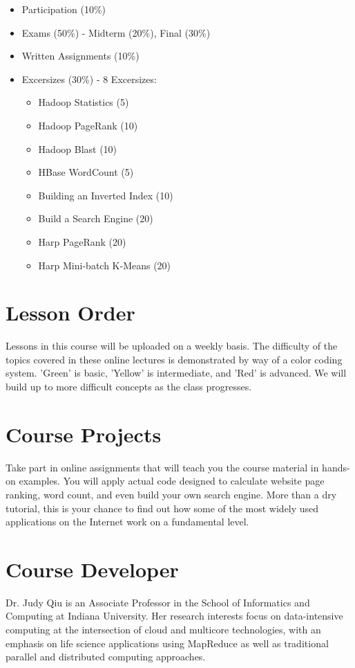 \begin{itemize}
  \item Participation (10\%)
  \item Exams (50\%) - Midterm (20\%), Final (30\%)
  \item Written Assignments (10\%)
  \item Excersizes (30\%) - 8 Excersizes: 
    \begin{itemize}
      \item Hadoop Statistics (5)
      \item Hadoop PageRank (10)
      \item Hadoop Blast (10)
      \item HBase WordCount (5)
      \item Building an Inverted Index (10)
      \item Build a Search Engine (20)
      \item Harp PageRank (20)
      \item Harp Mini-batch K-Means (20)
    \end{itemize}
\end{itemize}

\section{Lesson Order}

Lessons in this course will be uploaded on a weekly basis. The difficulty of
the topics covered in these online lectures is demonstrated by way of a color
coding system. 'Green' is basic, 'Yellow' is intermediate, and 'Red' is
advanced. We will build up to more difficult concepts as the class progresses.

\section{Course Projects}

Take part in online assignments that will teach you the course material in
hands-on examples. You will apply actual code designed to calculate website
page ranking, word count, and even build your own search engine. More than a
dry tutorial, this is your chance to find out how some of the most widely used
applications on the Internet work on a fundamental level.

\section{Course Developer}
Dr. Judy Qiu is an Associate Professor in the School of Informatics and
Computing at Indiana University. Her research interests focus on data-intensive
computing at the intersection of cloud and multicore technologies, with an
emphasis on life science applications using MapReduce as well as traditional
parallel and distributed computing approaches.

